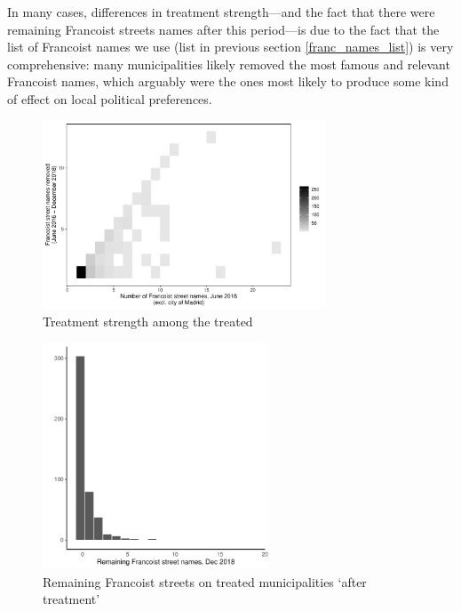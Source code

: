 \documentclass[12pt, titlepage]{article}
\begin{document}
In many cases, differences in treatment strength---and the fact that there were remaining Francoist streets names after this period---is due to the fact that the list of Francoist names we use (list in previous section \ref{franc_names_list}) is very comprehensive: many municipalities likely removed the most famous and relevant Francoist names, which arguably were the ones most likely to produce some kind of effect on local political preferences.

\begin{figure}[htb!]
\centering

  \includegraphics[width = 0.75\textwidth]{img/trt_strength_st2016}

  \caption{Treatment strength among the treated}\label{fig:trt_strength_st2016}

\end{figure}

\begin{figure}[htb!]
\centering

  \includegraphics[width = 0.6\textwidth]{img/trt_remaining}

  \caption{Remaining Francoist streets on treated municipalities `after treatment'}\label{fig:trt_remaining}

\end{figure}
\end{document}
